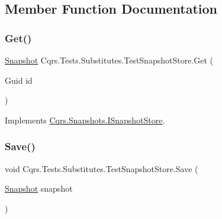 \subsection{Member Function Documentation}
\mbox{\label{classCqrs_1_1Tests_1_1Substitutes_1_1TestSnapshotStore_a8f07b513e21a7ed7ea0f52a41c9586ba_a8f07b513e21a7ed7ea0f52a41c9586ba}} 
\subsubsection{\texorpdfstring{Get()}{Get()}}
{\footnotesize\ttfamily \hyperlink{classCqrs_1_1Snapshots_1_1Snapshot}{Snapshot} Cqrs.\+Tests.\+Substitutes.\+Test\+Snapshot\+Store.\+Get (\begin{DoxyParamCaption}\item[{Guid}]{id }\end{DoxyParamCaption})}



Implements \hyperlink{interfaceCqrs_1_1Snapshots_1_1ISnapshotStore_a08af77cd80a9134f17033a479325330c_a08af77cd80a9134f17033a479325330c}{Cqrs.\+Snapshots.\+I\+Snapshot\+Store}.

\mbox{\label{classCqrs_1_1Tests_1_1Substitutes_1_1TestSnapshotStore_a223dbc9583120dec1469c1f84b863eae_a223dbc9583120dec1469c1f84b863eae}} 
\subsubsection{\texorpdfstring{Save()}{Save()}}
{\footnotesize\ttfamily void Cqrs.\+Tests.\+Substitutes.\+Test\+Snapshot\+Store.\+Save (\begin{DoxyParamCaption}\item[{\hyperlink{classCqrs_1_1Snapshots_1_1Snapshot}{Snapshot}}]{snapshot }\end{DoxyParamCaption})}



